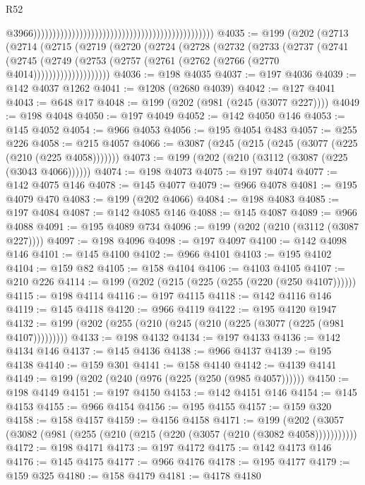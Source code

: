 \begin{lexlean}{R52}
\begin{coremodule}
                                                                                                  @3966)))))))))))))))))))))))))))))))))))))))))))))))
@4035 := @199
    (@202
      (@2713
        (@2714
          (@2715
            (@2719
              (@2720
                (@2724
                  (@2728
                    (@2732
                      (@2733
                        (@2737
                          (@2741
                            (@2745
                              (@2749
                                (@2753 (@2757 (@2761 (@2762 (@2766 (@2770 @4014))))))))))))))))))))
@4036 := @198 @4035
@4037 := @197 @4036
@4039 := @142 @4037 @1262
@4041 := @1208 (@2680 @4039)
@4042 := @127 @4041
@4043 := @648 @17
@4048 := @199 (@202 (@981 (@245 (@3077 @227))))
@4049 := @198 @4048
@4050 := @197 @4049
@4052 := @142 @4050 @146
@4053 := @145 @4052
@4054 := @966 @4053
@4056 := @195 @4054 @483
@4057 := @255 @226
@4058 := @215 @4057
@4066 := @3087 (@245 (@215 (@245 (@3077 (@225 (@210 (@225 @4058)))))))
@4073 := @199 (@202 (@210 (@3112 (@3087 (@225 (@3043 @4066))))))
@4074 := @198 @4073
@4075 := @197 @4074
@4077 := @142 @4075 @146
@4078 := @145 @4077
@4079 := @966 @4078
@4081 := @195 @4079 @470
@4083 := @199 (@202 @4066)
@4084 := @198 @4083
@4085 := @197 @4084
@4087 := @142 @4085 @146
@4088 := @145 @4087
@4089 := @966 @4088
@4091 := @195 @4089 @734
@4096 := @199 (@202 (@210 (@3112 (@3087 @227))))
@4097 := @198 @4096
@4098 := @197 @4097
@4100 := @142 @4098 @146
@4101 := @145 @4100
@4102 := @966 @4101
@4103 := @195 @4102
@4104 := @159 @82
@4105 := @158 @4104
@4106 := @4103 @4105
@4107 := @210 @226
@4114 := @199 (@202 (@215 (@225 (@255 (@220 (@250 @4107))))))
@4115 := @198 @4114
@4116 := @197 @4115
@4118 := @142 @4116 @146
@4119 := @145 @4118
@4120 := @966 @4119
@4122 := @195 @4120 @1947
@4132 := @199 (@202 (@255 (@210 (@245 (@210 (@225 (@3077 (@225 (@981 @4107)))))))))
@4133 := @198 @4132
@4134 := @197 @4133
@4136 := @142 @4134 @146
@4137 := @145 @4136
@4138 := @966 @4137
@4139 := @195 @4138
@4140 := @159 @301
@4141 := @158 @4140
@4142 := @4139 @4141
@4149 := @199 (@202 (@240 (@976 (@225 (@250 (@985 @4057))))))
@4150 := @198 @4149
@4151 := @197 @4150
@4153 := @142 @4151 @146
@4154 := @145 @4153
@4155 := @966 @4154
@4156 := @195 @4155
@4157 := @159 @320
@4158 := @158 @4157
@4159 := @4156 @4158
@4171 := @199 (@202 (@3057 (@3082 (@981 (@255 (@210 (@215 (@220 (@3057 (@210 (@3082 @4058)))))))))))
@4172 := @198 @4171
@4173 := @197 @4172
@4175 := @142 @4173 @146
@4176 := @145 @4175
@4177 := @966 @4176
@4178 := @195 @4177
@4179 := @159 @325
@4180 := @158 @4179
@4181 := @4178 @4180

\end{coremodule}
\end{lexlean}
